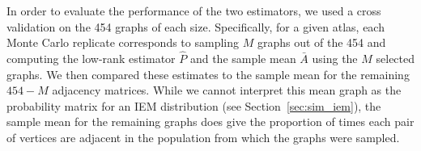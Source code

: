 \documentclass[10pt,letterpaper]{article}
\renewcommand{\hat}{\widehat}
\begin{document}




In order to evaluate the performance of the two estimators, we used a cross validation on the 454 graphs of each size. 
Specifically, for a given atlas, each Monte Carlo replicate corresponds to sampling $M$ graphs out of the 454 and computing the low-rank estimator $\hat{P}$ and the sample mean $\bar{A}$ using the $M$ selected graphs.
We then compared these estimates to the sample mean for the remaining $454-M$ adjacency matrices.
While we cannot interpret this mean graph as the probability matrix for an IEM distribution (see Section~\ref{sec:sim_iem}), the sample mean for the remaining graphs does give the proportion of times each pair of vertices are adjacent in the population from which the graphs were sampled.
\end{document}
